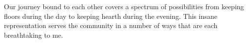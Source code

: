 

Our journey bound to each other covers a spectrum of possibilities
from keeping floors during the day to keeping hearth during the
evening.  This insane representation serves the community in a number
of ways that are each breathtaking to me. 

\bye
